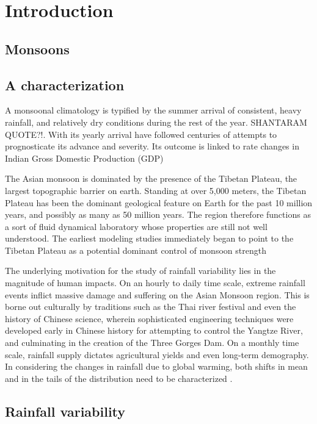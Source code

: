 \chapter{Introduction}

\section{Monsoons}

\section{A characterization}

A monsoonal climatology is typified by the summer arrival of consistent, heavy rainfall, and relatively dry conditions during the rest of the year. SHANTARAM QUOTE?!. With its yearly arrival have followed centuries of attempts to prognosticate its advance and severity. Its outcome is linked to rate changes in Indian Gross Domestic Production (GDP) \citep{Gadgil}

The Asian monsoon is dominated by the presence of the Tibetan Plateau, the largest topographic barrier on earth. Standing at over 5,000 meters, the Tibetan Plateau has been the dominant geological feature on Earth for the past 10 million years, and possibly as many as 50 million years. The region therefore functions as a sort of fluid dynamical laboratory whose properties are still not well understood. The earliest modeling studies immediately began to point to the Tibetan Plateau as a potential dominant control of monsoon strength \cite{Manabe}

The underlying motivation for the study of rainfall variability lies in the magnitude of human impacts. On an hourly to daily time scale, extreme rainfall events inflict massive damage and suffering on the Asian Monsoon region. This is borne out culturally by traditions such as the Thai river festival and even the history of Chinese science, wherein sophisticated engineering techniques were developed early in Chinese history for attempting to control the Yangtze River, and culminating in the creation of the Three Gorges Dam. On a monthly time scale, rainfall supply dictates agricultural yields and even long-term demography. In considering the changes in rainfall due to global warming, both shifts in mean and in the tails of the distribution need to be characterized \cite{Pendergrass}.


\section{Rainfall variability}

